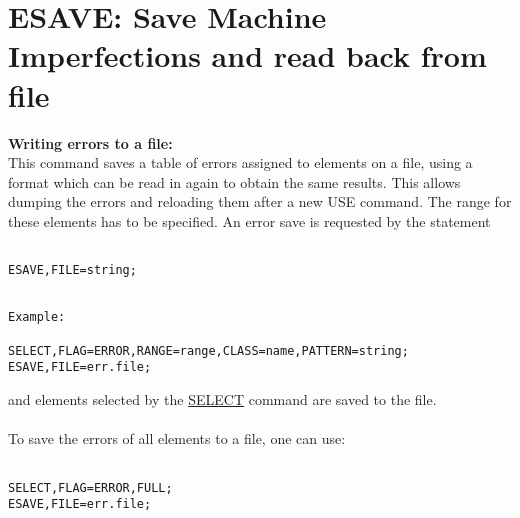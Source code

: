 





\section{ESAVE: Save Machine Imperfections and read back from file}
\textbf{Writing errors to a file:}
\\ This command saves a table of errors assigned to elements on a file, using a format which can be read in again to obtain the same results. This allows dumping the errors and reloading them after a new USE command. The range for these elements has to be specified. An error save is requested by the statement 
\begin{verbatim}

ESAVE,FILE=string;
\end{verbatim}
\begin{verbatim}

Example: 

SELECT,FLAG=ERROR,RANGE=range,CLASS=name,PATTERN=string;
ESAVE,FILE=err.file;
\end{verbatim} and elements selected by the  \href{../Introduction/select.html}{SELECT} command are saved to the file. 
\\
\\ To save the errors of all elements to a file, one can use: 
\\
\begin{verbatim}

SELECT,FLAG=ERROR,FULL;                                    
ESAVE,FILE=err.file;
\end{verbatim}

